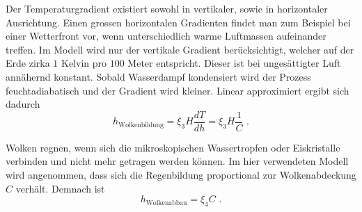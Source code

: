 \begin{refsection}
Der Temperaturgradient existiert sowohl in vertikaler, sowie in horizontaler Ausrichtung. Einen grossen horizontalen Gradienten findet man zum Beispiel bei einer Wetterfront vor, wenn unterschiedlich warme Luftmassen aufeinander treffen. Im Modell wird nur der vertikale Gradient berücksichtigt, welcher auf der Erde zirka $1$ Kelvin pro $100$ Meter entspricht. Dieser ist bei ungesättigter Luft annähernd konstant. Sobald Wasserdampf kondensiert wird der Prozess feuchtadiabatisch und der Gradient wird kleiner. Linear approximiert ergibt sich dadurch
\begin{equation}
h_{\text{Wolkenbildung}} = \xi_3 H \frac{dT}{dh} = \xi_3 H \frac{1}{C} \text{ .}
\end{equation}

Wolken regnen, wenn sich die mikroskopischen Wassertropfen oder Eiskristalle verbinden und nicht mehr getragen werden können. Im hier verwendeten Modell wird angenommen, dass sich die Regenbildung proportional zur Wolkenabdeckung $C$ verhält. Demnach ist
\begin{equation}
h_{\text{Wolkenabbau}} = \xi_4 C \text{ .}
\end{equation}


%



\end{refsection}
